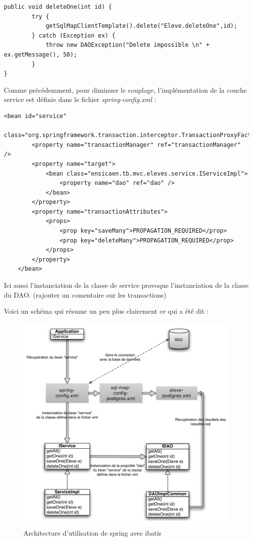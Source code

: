 \documentclass[a4paper,12pt]{article}
\begin{document}
\begin{lstlisting}
public void deleteOne(int id) {
		try {
			getSqlMapClientTemplate().delete("Eleve.deleteOne",id);
		} catch (Exception ex) {
			throw new DAOException("Delete impossible \n" + ex.getMessage(), 50);
		}
}
\end{lstlisting}

Comme précédemment, pour diminuer le couplage, l'implémentation de la couche service est définie dans le fichier \textit{spring-config.xml} :

\begin{lstlisting}
<bean id="service"
		class="org.springframework.transaction.interceptor.TransactionProxyFactoryBean">
		<property name="transactionManager" ref="transactionManager" />
		<property name="target">
			<bean class="ensicaen.tb.mvc.eleves.service.IServiceImpl">
				<property name="dao" ref="dao" />
			</bean>
		</property>
		<property name="transactionAttributes">
			<props>
				<prop key="saveMany">PROPAGATION_REQUIRED</prop>
				<prop key="deleteMany">PROPAGATION_REQUIRED</prop>
			</props>
		</property>
	</bean>
\end{lstlisting}

Ici aussi l'instanciation de la classe de service provoque l'instanciation de la classe du DAO. (rajouter un comentaire sur les transactions)

Voici un schéma qui résume un peu plus clairement ce qui a été dit :

\begin{figure}[H]
	\center
	\includegraphics[width=15cm]{img/springibatis.pdf}
	\caption{Architecture d'utilisation de spring avec ibatis}
\end{figure}

\newpage
\end{document}

